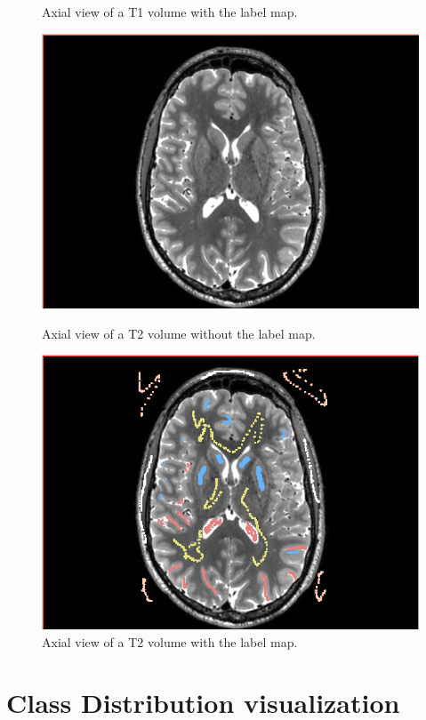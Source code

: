 \begin{figure}
\begin{minipage}[c]{.45\textwidth}
  \caption{Axial view of a T1 volume with the label map.}\label{fig:LabelT1}
\end{minipage}
\begin{minipage}[c]{.45\textwidth}\centering
  \includegraphics[width=.95\textwidth]{Images/Screenshots/T2ForLabel.png}
  \caption{Axial view of a T2 volume without the label map.}\label{fig:T2ForLabel}
\end{minipage}\hfill
\begin{minipage}[c]{.45\textwidth}\centering
  \includegraphics[width=.95\textwidth]{Images/Screenshots/LabelT2.png}
  \caption{Axial view of a T2 volume with the label map.}\label{fig:LabelT2}
\end{minipage}
\end{figure}
%
\section{Class Distribution visualization}\label{sec:tables}

